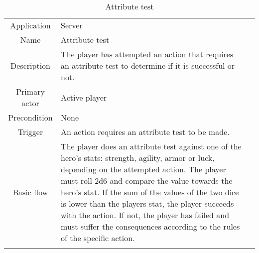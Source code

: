 \begin{table}
\caption{Attribute test}
\label{attributetest}
\begin{tabular}{|c| p{9cm}|c}
\hline
Application & Server & \\
Name & Attribute test & \\
Description & The player has attempted an action that requires an attribute test to determine if it is successful or not. & \\
Primary actor & Active player & \\
Precondition & None & \\
Trigger & An action requires an attribute test to be made. & \\ \hline
Basic flow & The player does an attribute test against one of the hero's stats: strength, agility, armor or luck, depending on the attempted action. The player must roll 2d6 and compare the value towards the hero's stat. If the sum of the values of the two dice is lower than the players stat, the player succeeds with the action. If not, the player has failed and must suffer the consequences according to the rules of the specific action. & \\ \hline
 \\
\hline
\end{tabular}
\end{table}


